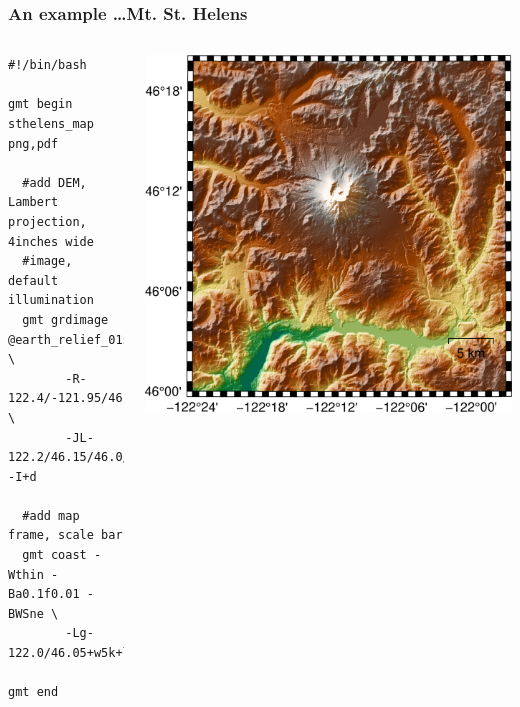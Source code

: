 \documentclass[unknownkeysallowed]{beamer}
\begin{document}
\begin{frame}[fragile=singleslide]
\frametitle{An example \dots Mt. St. Helens}
	\begin{columns}
		\tiny{
		\begin{verbatim}
#!/bin/bash

gmt begin sthelens_map png,pdf

  #add DEM, Lambert projection, 4inches wide 
  #image, default illumination
  gmt grdimage @earth_relief_01s \
        -R-122.4/-121.95/46.0/46.33 \
        -JL-122.2/46.15/46.0/46.3/4i -I+d

  #add map frame, scale bar
  gmt coast -Wthin -Ba0.1f0.01 -BWSne \
        -Lg-122.0/46.05+w5k+l+c46.1

gmt end		
		\end{verbatim}
}
		\begin{center}
				\includegraphics[width=\textwidth]{../figures/gmt_sthelens_map_02.png}	
		\end{center}
	\end{columns}
\end{frame}
\end{document}
